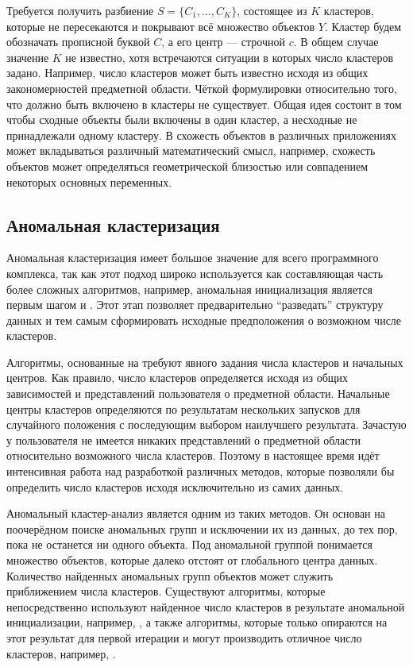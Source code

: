 \documentclass[12pt]{diploma}
\begin{document}
	Требуется получить разбиение $ S = \{C_1,\ldots,C_K\} $, состоящее из $ K $ кластеров, которые не пересекаются и покрывают всё множество объектов $ Y $. Кластер будем обозначать прописной буквой $ C $, а его центр --- строчной $ c $. В общем случае значение $ K $ не известно, хотя встречаются ситуации в которых число кластеров задано. Например, число кластеров может быть известно исходя из общих закономерностей предметной области. Чёткой формулировки относительно того, что должно быть включено в кластеры не существует. Общая идея состоит в том чтобы сходные объекты были включены в один кластер, а несходные не принадлежали одному кластеру. В схожесть объектов в различных приложениях может вкладываться различный математический смысл, например, схожесть объектов может определяться геометрической близостью или совпадением некоторых основных переменных.

	\subsection{Аномальная кластеризация} \label{subsec:anomalous}
	Аномальная кластеризация \cite{anomalous-clustring} имеет большое значение для всего программного комплекса, так как этот подход широко используется как составляющая часть более сложных алгоритмов, например, аномальная инициализация является первым шагом \AWard и \AWardpb. Этот этап позволяет предварительно ``разведать'' структуру данных и тем самым сформировать исходные предположения о возможном числе кластеров. 
	
	Алгоритмы, основанные на \kmeans требуют явного задания числа кластеров и начальных центров. Как правило, число кластеров определяется исходя из общих зависимостей и представлений пользователя о предметной области. Начальные центры кластеров определяются по результатам нескольких запусков для случайного положения с последующим выбором наилучшего результата. Зачастую у пользователя не имеется никаких представлений о предметной области относительно возможного числа кластеров. Поэтому в настоящее время идёт интенсивная работа над разработкой различных методов, которые позволяли бы определить число кластеров исходя исключительно из самих данных. 
	
	Аномальный кластер-анализ является одним из таких методов. Он основан на поочерёдном поиске аномальных групп и исключении их из данных, до тех пор, пока не останется ни одного объекта. Под аномальной группой понимается множество объектов, которые далеко отстоят от глобального центра данных.  Количество найденных аномальных групп объектов может служить приближением числа кластеров. Существуют алгоритмы, которые непосредственно используют найденное число кластеров в результате аномальной инициализации, например, \ikmeans \cite{anomalous-clustring}, а также алгоритмы, которые только опираются на этот результат для первой итерации и могут производить отличное число кластеров, например, \AWardpb.
	
\end{document}

